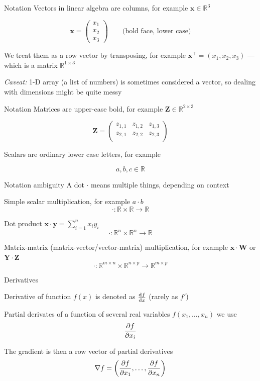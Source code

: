 \documentclass[12pt]{beamer}
\begin{document}
\begin{frame}{Notation}
	Vectors in linear algebra are columns, for example $\mathbf{x} \in \mathbb{R}^3$
	
$$
\mathbf{x} = 
\begin{pmatrix}
x_1 \\
x_2 \\
x_3
\end{pmatrix} \qquad \text{(bold face, lower case)}
$$

We treat them as a row vector by transposing, for example $\mathbf{x}^\intercal = (x_1, x_2, x_3)$ --- which is a matrix $\mathbb{R}^{1 \times 3}$

\emph{Caveat:} 1-D array (a list of numbers) is sometimes considered a vector, so dealing with dimensions might be quite messy
	
\end{frame}

\begin{frame}{Notation}
Matrices are upper-case bold, for example $\mathbf{Z} \in \mathbb{R}^{2 \times 3}$

$$
\mathbf{Z} =
\begin{pmatrix}
z_{1,1} & z_{1,2} & z_{1,3} \\
z_{2,1} & z_{2,2} & z_{2,3} \\
\end{pmatrix}
$$

Scalars are ordinary lower case letters, for example

$$
a, b, c \in \mathbb{R}
$$

\end{frame}

\begin{frame}{Notation ambiguity}
A dot $\cdot$ means multiple things, depending on context
	
Simple scalar multiplication, for example $a \cdot b$
$$\cdot : \mathbb{R} \times \mathbb{R} \to \mathbb{R}$$

Dot product $\mathbf{x} \cdot \mathbf{y} = \sum_{i = 1}^{n} x_i y_i$
$$\cdot : \mathbb{R}^n \times \mathbb{R}^n \to \mathbb{R}$$

Matrix-matrix (matrix-vector/vector-matrix) multiplication, for example $\mathbf{x} \cdot \mathbf{W}$ or $\mathbf{Y} \cdot \mathbf{Z}$
$$\cdot : \mathbb{R}^{m \times n} \times \mathbb{R}^{n \times p} \to \mathbb{R}^{m \times p}$$
	
\end{frame}

\begin{frame}{Derivatives}
	
Derivative of function $f(x)$ is denoted as $\dv{f}{x}$ (rarely as $f'$)

Partial derivates of a function of several real variables $f(x_1, \dots, x_n)$ we use
$$
\pdv{f}{x_i}
$$

The gradient is then a row vector of partial derivatives
$$
\nabla f = \left( \pdv{f}{x_1}, \dots, \pdv{f}{x_n}  \right)
$$
	
\end{frame}
\end{document}
